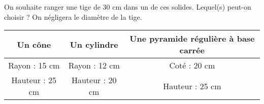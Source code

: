 
On souhaite ranger une tige de 30 cm dans un de ces solides. Lequel(s) peut-on choisir ? On négligera le diamètre de la tige.

\begin{tabular}{|c|c|c|}
\hline 
Un cône & Un cylindre & Une pyramide régulière à base carrée \\ 
\hline 
Rayon : 15 cm & Rayon : 12 cm & Coté : 20 cm \\ 
Hauteur : 25 cm & Hauteur : 20 cm & Hauteur : 25 cm \\ 
 \hline 
\end{tabular} 